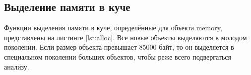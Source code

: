 %
%
%
%
%
%
%
%	
%
%	
%
%
%
%
%		
%		
%		
%		



\subsection{Выделение памяти в куче}

Функции выделения памяти в куче, определённые для объекта memory, представлены на листинге \ref{lst:alloc}. Все новые объекты выделяются в молодом поколении. Если размер объекта превышает 85000 байт, то он выделяется в специальном поколении больших объектов, чтобы реже всего подвергаться анализу.

